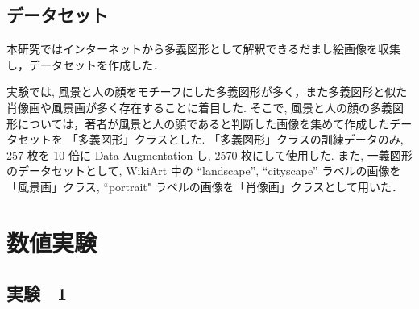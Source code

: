 \documentclass[twocolumn]{jarticle}     %
\newcommand{\1}{\mbox{1}\hspace{-0.25em}\mbox{l}}
\begin{document}
\subsection{データセット}
本研究ではインターネットから多義図形として解釈できるだまし絵画像を収集し，データセットを作成した．\par
実験では, 風景と人の顔をモチーフにした多義図形が多く，また多義図形と似た肖像画や風景画が多く存在することに着目した. そこで, 風景と人の顔の多義図形については，著者が風景と人の顔であると判断した画像を集めて作成したデータセットを 「多義図形」クラスとした. 「多義図形」クラスの訓練データのみ, 257 枚を 10 倍に Data Augmentation し, 2570 枚にして使用した. また, 一義図形のデータセットとして, WikiArt \cite{wikiart} 中の ``landscape'', ``cityscape'' ラベルの画像を「風景画」クラス, ``portrait" ラベルの画像を「肖像画」クラスとして用いた．\par


\section{数値実験}
\label{sec:exp}
\subsection{実験　1}
\end{document}
